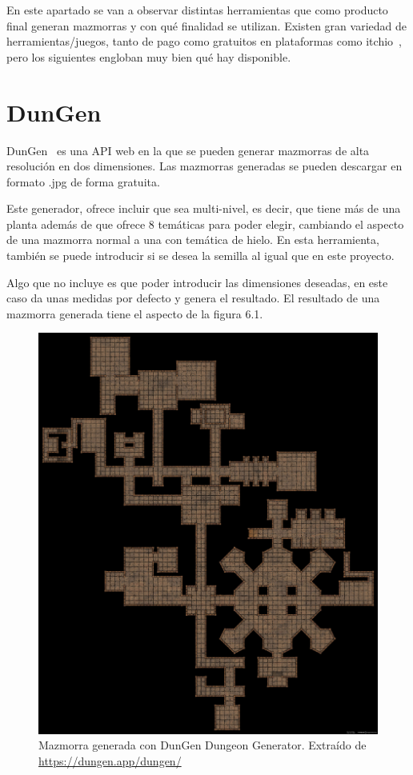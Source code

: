 
En este apartado se van a observar distintas herramientas que como producto final generan mazmorras y con qué finalidad se utilizan.
Existen gran variedad de herramientas/juegos, tanto de pago como gratuitos en plataformas como itchio~\cite{itchio}, pero los siguientes engloban muy bien qué hay disponible.

\section{DunGen}
DunGen~\cite{DunGen} es una API web en la que se pueden generar mazmorras de alta resolución en dos dimensiones. Las mazmorras generadas se pueden descargar en formato .jpg de forma gratuita.

Este generador, ofrece incluir que sea multi-nivel, es decir, que tiene más de una planta además de que ofrece 8 temáticas para poder elegir, cambiando el aspecto de una mazmorra normal a una con temática de hielo. 
En esta herramienta, también se puede introducir si se desea la semilla al igual que en este proyecto.

Algo que no incluye es que poder introducir las dimensiones deseadas, en este caso da unas medidas por defecto y genera el resultado.
El resultado de una mazmorra generada tiene el aspecto de la figura 6.1.
\begin{figure}[ht!]  
    \centering  
    \includegraphics[width=\textwidth]{img/DunGenMediumExample.jpg}  
    \caption{Mazmorra generada con DunGen Dungeon Generator. Extraído de \url{https://dungen.app/dungen/}  }
    \label{fig:MazmorraDunGen}
\end{figure}

